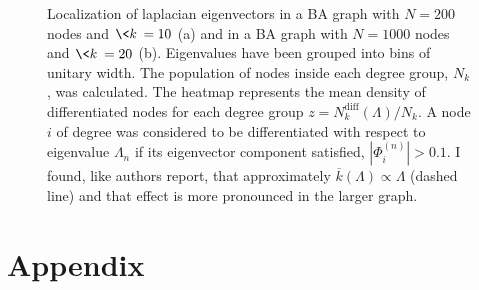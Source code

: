 \begin{figure}[H]
    \centering
{}
\caption{Localization of laplacian eigenvectors in a BA graph with $N=200$ nodes and $\<k\>=10$ (a) and in a BA graph with $N=1000$ nodes and $\<k\>=20$ (b). Eigenvalues have been grouped into bins of unitary width. The population of nodes inside each degree group, $N_k$, was calculated. The heatmap represents the mean density of differentiated nodes for each degree group $z = N_k^{\text{diff}}(\Lambda)/N_k$. A node $i$ of degree was considered to be differentiated with respect to eigenvalue $\Lambda_n$ if its eigenvector component satisfied, $|\Phi_i^{(n)}|> 0.1$. I found, like authors \cite{main_network} report, that approximately $\overline{k}(\Lambda) \propto \Lambda$ (dashed line) and that effect is more pronounced in the larger graph.}
\label{fig:heatmap}
\end{figure}

\nocite{bio_article}
\nocite{murray}
\nocite{altbook}
\newpage
\section*{Appendix}
